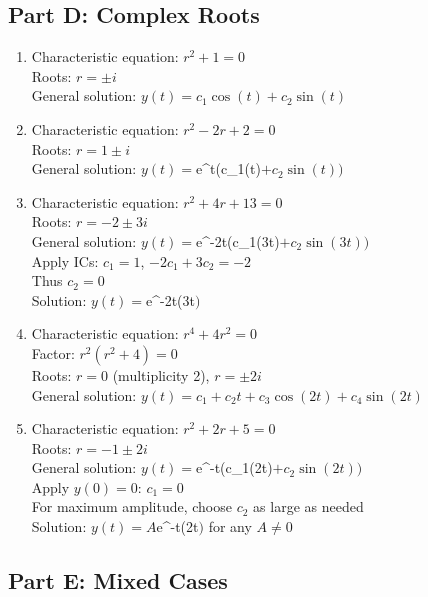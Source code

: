\documentclass[12pt]{article}
\begin{document}
\subsection*{Part D: Complex Roots}

\begin{enumerate}[resume]
\item Characteristic equation: $r^2 + 1 = 0$\\
Roots: $r = \pm i$\\
General solution: $y(t) = c_1\cos(t) + c_2\sin(t)$

\item Characteristic equation: $r^2 - 2r + 2 = 0$\\
Roots: $r = 1 \pm i$\\
General solution: $y(t) = $e^t(c_1\cos(t)$ + c_2\sin(t))$

\item Characteristic equation: $r^2 + 4r + 13 = 0$\\
Roots: $r = -2 \pm 3i$\\
General solution: $y(t) = $e^{-2t}(c_1\cos(3t)$ + c_2\sin(3t))$\\
Apply ICs: $c_1 = 1$, $-2c_1 + 3c_2 = -2$\\
Thus $c_2 = 0$\\
Solution: $y(t) = $e^{-2t}\cos(3t$)$

\item Characteristic equation: $r^4 + 4r^2 = 0$\\
Factor: $r^2(r^2 + 4) = 0$\\
Roots: $r = 0$ (multiplicity 2), $r = \pm 2i$\\
General solution: $y(t) = c_1 + c_2t + c_3\cos(2t) + c_4\sin(2t)$

\item Characteristic equation: $r^2 + 2r + 5 = 0$\\
Roots: $r = -1 \pm 2i$\\
General solution: $y(t) = $e^{-t}(c_1\cos(2t)$ + c_2\sin(2t))$\\
Apply $y(0) = 0$: $c_1 = 0$\\
For maximum amplitude, choose $c_2$ as large as needed\\
Solution: $y(t) = A$e^{-t}\sin(2t$)$ for any $A \neq 0$
\end{enumerate}

\subsection*{Part E: Mixed Cases}
\end{document}
